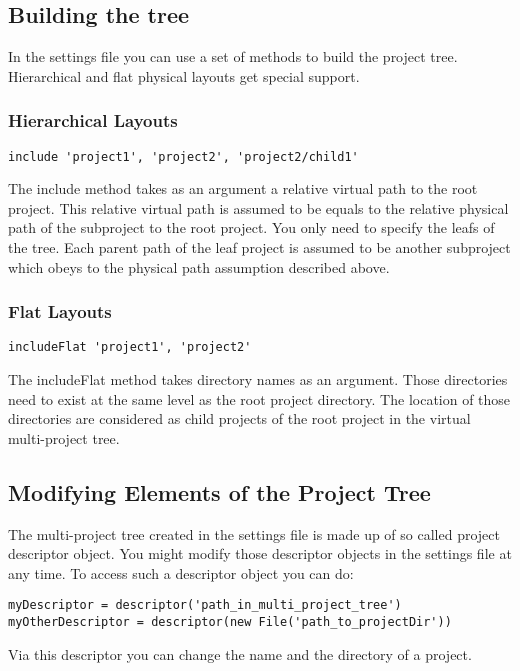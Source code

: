 \subsection{Building the tree} %
\label{sub:building_the_tree}
In the settings file you can use a set of methods to build the project tree. Hierarchical and flat physical layouts get special support. 
\subsubsection{Hierarchical Layouts} %
\begin{Verbatim}
include 'project1', 'project2', 'project2/child1'
\end{Verbatim}
The include method takes as an argument a relative virtual path to the root project. This relative virtual path is assumed to be equals to the relative physical path of the subproject to the root project. You only need to specify the leafs of the tree. Each parent path of the leaf project is assumed to be another subproject which obeys to the physical path assumption described above.
\subsubsection{Flat Layouts} %
\begin{Verbatim}
includeFlat 'project1', 'project2'
\end{Verbatim}
The includeFlat method takes directory names as an argument. Those directories need to exist at the same level as the root project directory. The location of those directories are considered as child projects of the root project in the virtual multi-project tree.

\subsection{Modifying Elements of the Project Tree} %
\label{sub:modifying_element_of_the_project_tree}
The multi-project tree created in the settings file is made up of so called project descriptor object. You might modify those descriptor objects in the settings file at any time. To access such a descriptor object you can do:
\begin{Verbatim}
myDescriptor = descriptor('path_in_multi_project_tree')
myOtherDescriptor = descriptor(new File('path_to_projectDir')) 
\end{Verbatim}
Via this descriptor you can change the name and the directory of a project.

